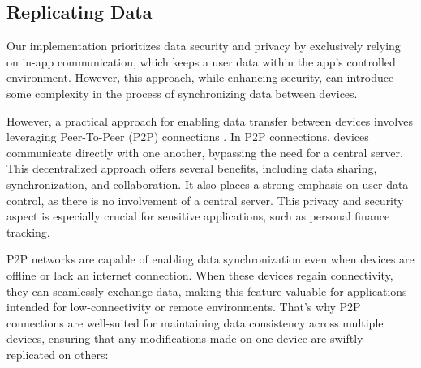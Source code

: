 
\subsection{Replicating Data}

Our implementation prioritizes data security and privacy by exclusively relying on in-app communication, which keeps 
a user data within the app's controlled environment. However, this approach, while enhancing security, can introduce 
some complexity in the process of synchronizing data between devices. 

However, a practical approach for enabling data transfer between devices involves leveraging Peer-To-Peer (P2P) 
connections . In P2P connections, devices communicate directly with one another, bypassing the need for a 
central server. This decentralized approach offers several benefits, including data sharing, synchronization, and 
collaboration. It also places a strong emphasis on user data control, as there is no involvement of a central server. 
This privacy and security aspect is especially crucial for sensitive applications, such as personal finance tracking.

P2P networks are capable of enabling data synchronization even when devices are offline or lack an internet connection. 
When these devices regain connectivity, they can seamlessly exchange data, making this feature valuable for applications 
intended for low-connectivity or remote environments. That's why P2P connections are well-suited for maintaining data 
consistency across multiple devices, ensuring that any modifications made on one device are swiftly replicated on others:

